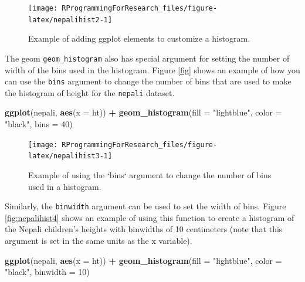 \documentclass[]{book}
\makeatletter
\newenvironment{Shaded}{\begin{snugshade}}{\end{snugshade}}
\newcommand{\KeywordTok}[1]{\textcolor[rgb]{0.13,0.29,0.53}{\textbf{#1}}}
\newcommand{\DataTypeTok}[1]{\textcolor[rgb]{0.13,0.29,0.53}{#1}}
\newcommand{\DecValTok}[1]{\textcolor[rgb]{0.00,0.00,0.81}{#1}}
\newcommand{\StringTok}[1]{\textcolor[rgb]{0.31,0.60,0.02}{#1}}
\newcommand{\OperatorTok}[1]{\textcolor[rgb]{0.81,0.36,0.00}{\textbf{#1}}}
\newcommand{\NormalTok}[1]{#1}
\newenvironment{kframe}{%
\medskip{}
\setlength{\fboxsep}{.8em}
 \def\at@end@of@kframe{}%
 \ifinner\ifhmode%
  \def\at@end@of@kframe{\end{minipage}}%
  \begin{minipage}{\columnwidth}%
 \fi\fi%
 \def\FrameCommand##1{\hskip\@totalleftmargin \hskip-\fboxsep
 \colorbox{shadecolor}{##1}\hskip-\fboxsep
     \hskip-\linewidth \hskip-\@totalleftmargin \hskip\columnwidth}%
 \MakeFramed {\advance\hsize-\width
   \@totalleftmargin\z@ \linewidth\hsize
   \@setminipage}}%
 {\par\unskip\endMakeFramed%
 \at@end@of@kframe}
\renewenvironment{Shaded}{\begin{kframe}}{\end{kframe}}
\theoremstyle{definition}
\theoremstyle{definition}
\theoremstyle{definition}
\theoremstyle{remark}
\makeatother
\begin{document}
\begin{figure}

{\centering \texttt{[image: RProgrammingForResearch\_files/figure-latex/nepalihist2-1]} 

}

\caption{Example of adding ggplot elements to customize a histogram.}\label{fig:nepalihist2}
\end{figure}

The geom \texttt{geom\_histogram} also has special argument for setting
the number of width of the bins used in the histogram. Figure \ref{fig}
shows an example of how you can use the \texttt{bins} argument to change
the number of bins that are used to make the histogram of height for the
\texttt{nepali} dataset.

\begin{Shaded}
\begin{Highlighting}[]
\KeywordTok{ggplot}\NormalTok{(nepali, }\KeywordTok{aes}\NormalTok{(}\DataTypeTok{x =}\NormalTok{ ht)) }\OperatorTok{+}\StringTok{ }
\StringTok{  }\KeywordTok{geom_histogram}\NormalTok{(}\DataTypeTok{fill =} \StringTok{"lightblue"}\NormalTok{, }\DataTypeTok{color =} \StringTok{"black"}\NormalTok{,}
                 \DataTypeTok{bins =} \DecValTok{40}\NormalTok{) }
\end{Highlighting}
\end{Shaded}

\begin{figure}

{\centering \texttt{[image: RProgrammingForResearch\_files/figure-latex/nepalihist3-1]} 

}

\caption{Example of using the `bins` argument to change the number of bins used in a histogram.}\label{fig:nepalihist3}
\end{figure}

Similarly, the \texttt{binwidth} argument can be used to set the width
of bins. Figure \ref{fig:nepalihist4} shows an example of using this
function to create a histogram of the Nepali children's heights with
binwidths of 10 centimeters (note that this argument is set in the same
units as the x variable).

\begin{Shaded}
\begin{Highlighting}[]
\KeywordTok{ggplot}\NormalTok{(nepali, }\KeywordTok{aes}\NormalTok{(}\DataTypeTok{x =}\NormalTok{ ht)) }\OperatorTok{+}\StringTok{ }
\StringTok{  }\KeywordTok{geom_histogram}\NormalTok{(}\DataTypeTok{fill =} \StringTok{"lightblue"}\NormalTok{, }\DataTypeTok{color =} \StringTok{"black"}\NormalTok{,}
                 \DataTypeTok{binwidth =} \DecValTok{10}\NormalTok{) }
\end{Highlighting}
\end{Shaded}
\end{document}
